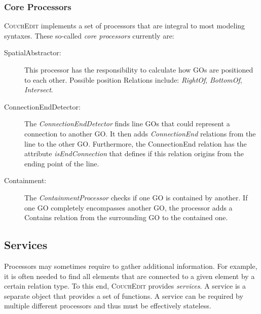 \subsubsection{Core Processors}
\label{sec:core-processors}
\textsc{CouchEdit} implements a set of processors that are integral to most modeling syntaxes. These so-called \emph{core processors} currently are: 
\begin{description}
  \item[SpatialAbstractor:] This processor has the responsibility to calculate how GOs are positioned to each other. Possible position Relations include: \emph{RightOf}, \emph{BottomOf}, \emph{Intersect}.
  \item[ConnectionEndDetector:] The \emph{ConnectionEndDetector} finds line GOs that could represent a connection to another GO. It then adds \emph{ConnectionEnd} relations from the line to the other GO. Furthermore, the ConnectionEnd relation has the attribute \emph{isEndConnection} that defines if this relation origins from the ending point of the line.
  \item[Containment:] The \emph{ContainmentProcessor} checks if one GO is contained by another. If one GO completely encompasses another GO, the processor adds a Contains relation from the surrounding GO to the contained one.
\end{description}

\subsection{Services}
\label{sec:services}
Processors may sometimes require to gather additional information. For example, it is often needed to find all elements that are connected to a given element by a certain relation type. To this end, \textsc{CouchEdit} provides \emph{services}. A service is a separate object that provides a set of functions. A service can be required by multiple different processors and thus must be effectively stateless.




